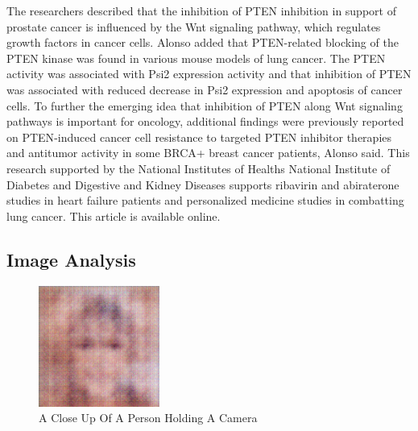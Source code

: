 \documentclass{article}%
\begin{document}
The researchers described that the inhibition of PTEN inhibition in support of prostate cancer is influenced by the Wnt signaling pathway, which regulates growth factors in cancer cells.\newline%
Alonso added that PTEN{-}related blocking of the PTEN kinase was found in various mouse models of lung cancer. The PTEN activity was associated with Psi2 expression activity and that inhibition of PTEN was associated with reduced decrease in Psi2 expression and apoptosis of cancer cells.\newline%
To further the emerging idea that inhibition of PTEN along Wnt signaling pathways is important for oncology, additional findings were previously reported on PTEN{-}induced cancer cell resistance to targeted PTEN inhibitor therapies and antitumor activity in some BRCA+ breast cancer patients, Alonso said.\newline%
This research supported by the National Institutes of Healths National Institute of Diabetes and Digestive and Kidney Diseases supports ribavirin and abiraterone studies in heart failure patients and personalized medicine studies in combatting lung cancer.\newline%
This article is available online.

%
\subsection{Image Analysis}%
\label{subsec:ImageAnalysis}%


\begin{figure}[h!]%
\centering%
\includegraphics[width=150px]{500_fake_images/samples_5_419.png}%
\caption{A Close Up Of A Person Holding A Camera}%
\end{figure}

%
\end{document}
